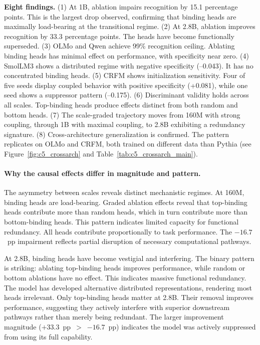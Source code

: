 \documentclass[10pt]{article} %
\begin{document}
\textbf{Eight findings.}
(1) At 1B, ablation impairs recognition by 15.1 percentage points. This is the largest drop observed, confirming that binding heads are maximally load-bearing at the transitional regime.
(2) At 2.8B, ablation improves recognition by 33.3 percentage points. The heads have become functionally superseded.
(3) OLMo and Qwen achieve 99\% recognition ceiling. Ablating binding heads has minimal effect on performance, with specificity near zero.
(4) SmolLM3 shows a distributed regime with negative specificity (--0.043). It has no concentrated binding heads.
(5) CRFM shows initialization sensitivity. Four of five seeds display coupled behavior with positive specificity (+0.081), while one seed shows a suppressor pattern (--0.175).
(6) Discriminant validity holds across all scales. Top-binding heads produce effects distinct from both random and bottom heads.
(7) The scale-graded trajectory moves from 160M with strong coupling, through 1B with maximal coupling, to 2.8B exhibiting a redundancy signature.
(8) Cross-architecture generalization is confirmed. The pattern replicates on OLMo and CRFM, both trained on different data than Pythia (see Figure~\ref{fig:c5_crossarch} and Table~\ref{tab:c5_crossarch_main}).

\paragraph{Why the causal effects differ in magnitude and pattern.}
The asymmetry between scales reveals distinct mechanistic regimes.
At 160M, binding heads are load-bearing. Graded ablation effects reveal that top-binding heads contribute more than random heads, which in turn contribute more than bottom-binding heads. This pattern indicates limited capacity for functional redundancy. All heads contribute proportionally to task performance.
The $-16.7$~pp impairment reflects partial disruption of necessary computational pathways.

At 2.8B, binding heads have become vestigial and interfering. The binary pattern is striking: ablating top-binding heads improves performance, while random or bottom ablations have no effect. This indicates massive functional redundancy.
The model has developed alternative distributed representations, rendering most heads irrelevant.
Only top-binding heads matter at 2.8B. Their removal improves performance, suggesting they actively interfere with superior downstream pathways rather than merely being redundant.
The larger improvement magnitude ($+33.3$~pp~$>$~$-16.7$~pp) indicates the model was actively suppressed from using its full capability.
\end{document}
